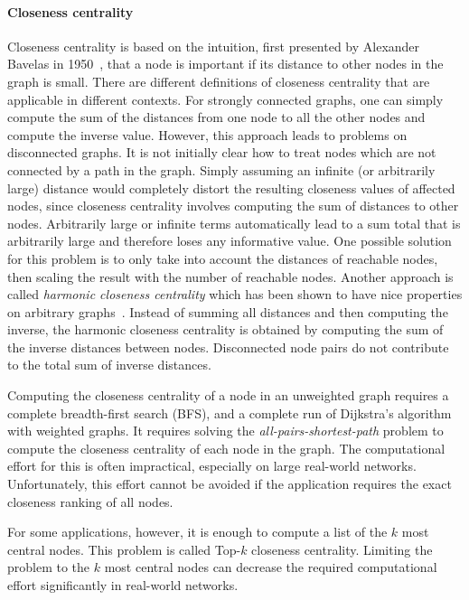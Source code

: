 \paragraph{Closeness centrality}
Closeness centrality is based on the intuition, first presented by Alexander Bavelas in 1950~\cite{bavelas1950communication}, that a node is important if its distance to other nodes in the graph is small. There are different definitions of closeness centrality that are applicable in different contexts. For strongly connected graphs, one can simply compute the sum of the distances from one node to all the other nodes and compute the inverse value. However, this approach leads to problems on disconnected graphs. It is not initially clear how to treat nodes which are not connected by a path in the graph. Simply assuming an infinite (or arbitrarily large) distance would completely distort the resulting closeness values of affected nodes, since closeness centrality involves computing the sum of distances to other nodes. Arbitrarily large or infinite terms automatically lead to a sum total that is arbitrarily large and therefore loses any informative value. One possible solution for this problem is to only take into account the distances of reachable nodes, then scaling the result with the number of reachable nodes. Another approach is called \emph{harmonic closeness centrality} which has been shown to have nice properties on arbitrary graphs~\cite{boldi2014axioms}. Instead of summing all distances and then computing the inverse, the harmonic closeness centrality is obtained by computing the sum of the inverse distances between nodes. Disconnected node pairs do not contribute to the total sum of inverse distances.

Computing the closeness centrality of a node in an unweighted graph requires a complete breadth-first search (BFS), and a complete run of Dijkstra's algorithm~\cite{dijkstra1959note} with weighted graphs. It requires solving the \emph{all-pairs-shortest-path} problem to compute the closeness centrality of each node in the graph. The computational effort for this is often impractical, especially on large real-world networks. Unfortunately, this effort cannot be avoided if the application requires the exact closeness ranking of all nodes.

For some applications, however, it is enough to compute a list of the $k$ most central nodes. This problem is called Top-$k$ closeness centrality. Limiting the problem to the $k$ most central nodes can decrease the required computational effort significantly in real-world networks. 

